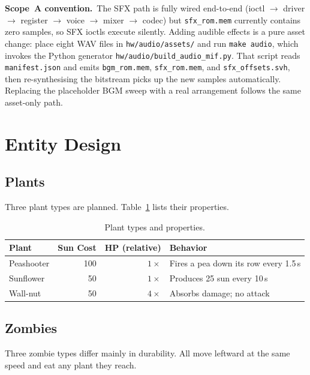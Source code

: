 \documentclass[11pt,letterpaper]{article}
\begin{document}
\textbf{Scope~A convention.}\ The SFX path is fully wired end-to-end
(ioctl $\to$ driver $\to$ register $\to$ voice $\to$ mixer $\to$ codec)
but \texttt{sfx\_rom.mem} currently contains zero samples, so SFX
ioctls execute silently.  Adding audible effects is a pure asset change:
place eight WAV files in \texttt{hw/audio/assets/} and run
\texttt{make audio}, which invokes the Python generator
\texttt{hw/audio/build\_audio\_mif.py}.  That script reads
\texttt{manifest.json} and emits \texttt{bgm\_rom.mem},
\texttt{sfx\_rom.mem}, and \texttt{sfx\_offsets.svh}, then
re-synthesising the bitstream picks up the new samples automatically.
Replacing the placeholder BGM sweep with a real arrangement follows the
same asset-only path.

\section{Entity Design}
\label{sec:entities}

\subsection{Plants}

Three plant types are planned. Table~\ref{tab:plants} lists their
properties.

\begin{table}[H]
\centering
\caption{Plant types and properties.}
\label{tab:plants}
\begin{tabular}{l r r l}
\toprule
\textbf{Plant} & \textbf{Sun Cost} & \textbf{HP (relative)} & \textbf{Behavior} \\
\midrule
Peashooter & 100 & $1\times$  & Fires a pea down its row every 1.5\,s \\
Sunflower  &  50 & $1\times$  & Produces 25 sun every 10\,s \\
Wall-nut   &  50 & $4\times$  & Absorbs damage; no attack \\
\bottomrule
\end{tabular}
\end{table}

\subsection{Zombies}

Three zombie types differ mainly in durability. All move leftward at the
same speed and eat any plant they reach.
\end{document}
